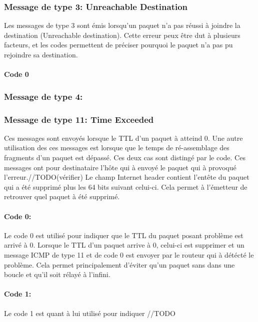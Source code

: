 \subsubsection{Message de type 3: Unreachable Destination}
Les messages de type 3 sont émis lorsqu'un paquet n'a pas réussi à joindre la
destination (Unreachable destination). Cette erreur peux être dut à plusieurs
facteurs, et les codes permettent de préciser pourquoi le paquet n'a pas pu
rejoindre sa destination.

\paragraph{Code 0}

\subsubsection{Message de type 4:}

\subsubsection{Message de type 11: Time Exceeded}
Ces messages sont envoyés lorsque le TTL d'un paquet à atteind 0. Une autre
utilisation des ces messages est lorsque que le temps de ré-assemblage des
fragments d'un paquet est dépassé. Ces deux cas sont distingé par le code. Ces
messages ont pour destinataire l'hôte qui à envoyé le paquet qui à provoqué
l'erreur.//TODO(vérifier) Le champ Internet header contient l'entête du paquet
qui a été supprimé plus les 64 bits suivant celui-ci. Cela permet à l'émetteur
de retrouver quel paquet à été supprimé.

\paragraph{Code 0:}
Le code 0 est utilisé pour indiquer que le TTL du paquet posant problème est arrivé à 0.
Lorsque le TTL d'un paquet arrive à 0, celui-ci est supprimer et un message
ICMP de type 11 et de code 0 est envoyer par le routeur qui à détécté le
problème. Cela permet principalement d'éviter qu'un paquet sans dans une boucle
et qu'il soit rélayé à l'infini.

\paragraph{Code 1:} Le code 1 est quant à lui
utilisé pour indiquer //TODO


